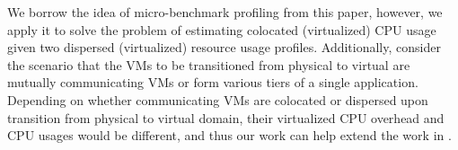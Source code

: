 
We borrow the idea of micro-benchmark profiling from this paper, however,
we apply it to solve the problem of estimating colocated (virtualized)
CPU usage given two dispersed (virtualized) resource usage profiles.
Additionally, consider the scenario that the VMs to be transitioned from 
physical to virtual are mutually
communicating VMs or form various tiers of a single application. 
Depending on whether communicating VMs are colocated or dispersed upon
transition from physical to virtual domain, their virtualized CPU overhead
and CPU usages would be different, and thus our work can help extend 
the work in \cite{profiling-and-modeling}.
